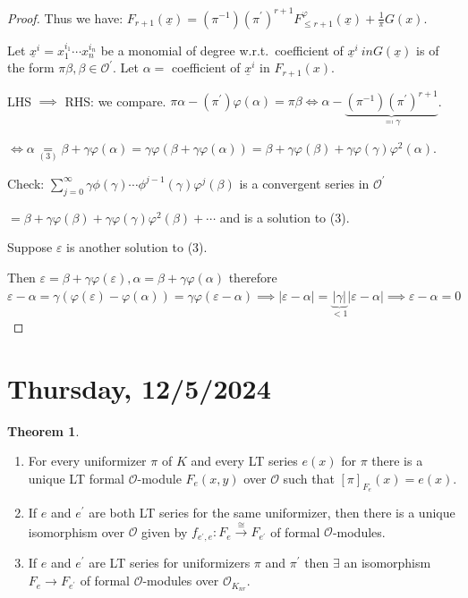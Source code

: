 \documentclass[openany]{amsbook}
\numberwithin{section}{chapter}
\theoremstyle{definition}
\newtheorem{theorem}{Theorem}[chapter]
\begin{document}
\begin{proof}
    
    Thus we have: \(F_{r+1}(\underline{x}) = (\pi ^{-1})(\pi ^{\prime})^{r+1} F^{\varphi}_{\leq r+1}(\underline{x}) + \frac{1}{\pi}G(x) \).
    
    Let \(\underline{x}^i = x_1^{i_1} \cdots x_n^{i_n}\) be a monomial of degree w.r.t.\ coefficient of \(\underline{x}^i\ in G(\underline{x})\) is of the form \(\pi \beta, \beta\in \mathcal{O} ^{\prime} \). Let \(\alpha =\) coefficient of \(\underline{x}^i\) in \(F_{r+1}(x)\).

    LHS \(\implies\) RHS: we compare. \(\pi \alpha - (\pi ^{\prime}) \varphi(\alpha) = \pi \beta  \iff \alpha -\underbrace{(\pi ^{-1} )(\pi^{\prime})^{r+1}}_{\eqqcolon \gamma}\).
    
    \(\iff \alpha \underset{(3)}{=} \beta + \gamma \varphi(\alpha) = \gamma \varphi (\beta + \gamma \varphi(\alpha)) = \beta + \gamma \varphi(\beta)+ \gamma \varphi(\gamma)\varphi^2(\alpha)\).

    Check: \(\sum_{j=0}^{\infty} \gamma \phi(\gamma) \cdots \phi^{j-1}(\gamma) \varphi^{j}(\beta) \) is a convergent series in \(\mathcal{O} ^{\prime} \) 
    
    \(=\beta + \gamma \varphi(\beta) + \gamma \varphi(\gamma) \varphi^2(\beta)+\cdots\) and is a solution to (3).

    Suppose \(\varepsilon\) is another solution to (3).
    
    Then \(\varepsilon = \beta + \gamma \varphi (\varepsilon), \alpha = \beta + \gamma \varphi(\alpha)\) therefore \(\varepsilon - \alpha = \gamma (\varphi(\varepsilon)-\varphi(\alpha))=\gamma \varphi (\varepsilon -\alpha) \implies \vert \varepsilon -\alpha \vert = \underbrace{\vert \gamma \vert }_{< 1} \vert \varepsilon - \alpha \vert \implies \varepsilon - \alpha = 0\) 

\end{proof}

\section*{Thursday, 12/5/2024}

\begin{theorem}
    \begin{enumerate}[label=\roman*)]
        \item For every uniformizer \(\pi\) of \(K\) and every LT series \(e(x)\) for \(\pi\) there is a unique LT formal \(\mathcal{O}\)-module \(F_e(x,y)\) over \(\mathcal{O}\) such that \([\pi]_{F_e}(x) = e(x)\).
        \item If \(e\) and \(e^{\prime}\) are both LT series for the same uniformizer, then there is a unique isomorphism over \(\mathcal{O}\) given by \(f_{e^{\prime},e}: F_e \overset{\cong}{\to} F_{e^{\prime}}\) of formal \(\mathcal{O}\)-modules.
        \item If \(e\) and \(e^{\prime}\) are LT series for uniformizers \(\pi\) and \(\pi^{\prime}\) then \(\exists\) an isomorphism \(F_e \to F_{e^{\prime}}\) of formal \(\mathcal{O}\)-modules over \(\mathcal{O}_{K_{nr}}\).
    \end{enumerate} 
\end{theorem}
\end{document}
